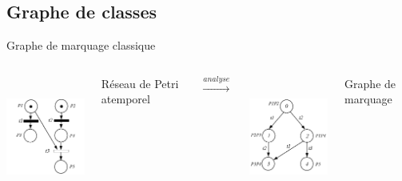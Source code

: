 \documentclass[compress]{beamer}
\begin{document}

\subsection{Graphe de classes}
\begin{frame}{Graphe de marquage classique}
\begin{columns}
	\centerline{\includegraphics[height=4cm]{rdp_sanst}} \vspace{1ex}
	\centerline{Réseau de Petri atemporel}
 $\stackrel{analyse}{\longrightarrow}$
	\centerline{\includegraphics[height=4cm]{graph_m}} \vspace{1ex}
	\centerline{Graphe de marquage}
\end{columns}
\end{frame}
\end{document}
